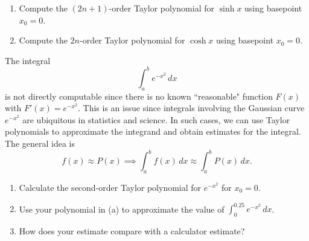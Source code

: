 \documentclass[12pt,letterpaper]{hmcpset}
\newcommand{\ds}{\displaystyle}
\begin{document}

\begin{problem}[1]
  \begin{enumerate}[label=(\alph*)]
  \item Compute the $(2n+1)$-order Taylor polynomial for $\sinh x$ using basepoint $x_0 = 0$. 
  \item Compute the $2n$-order Taylor polynomial for $\cosh x$ using basepoint  $x_0 = 0$. 
  \end{enumerate}
\end{problem}
\begin{solution}
\end{solution}
\pagebreak

\begin{problem}[2]
  The integral 
  \begin{equation}
    \int_a^b e^{-x^2} \, dx
    \label{int}
  \end{equation}
  is not directly computable since there is no known ``reasonable" function $F(x)$ with $F'(x) = e^{-x^2}$. This is an issue since integrals involving the Gaussian curve $e^{-x^2}$  are ubiquitous in statistics and science. In such cases, we can use Taylor polynomials to approximate the integrand and obtain estimates for the integral.  The general idea is 
  \[ f(x) \approx P(x) \implies \int_a^b f(x) \, dx \approx \int_a^b P(x) \, dx.  \]
  \begin{enumerate}[label=(\alph*)]
  \item Calculate the second-order Taylor polynomial for $e^{-x^2}$ for $x_0=0$. 
  \item Use your polynomial in (a)  to approximate the value of $\ds  \int_0^{0.25} e^{-x^2} \, dx$. 
  \item How does your estimate compare with a calculator estimate? 
  \end{enumerate}
\end{problem}
\begin{solution}
\end{solution}
\pagebreak
\end{document}
